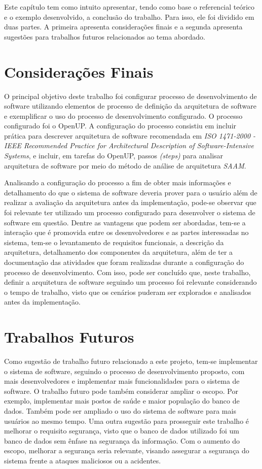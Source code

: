 Este capítulo tem como intuito apresentar, tendo como base o referencial teórico e o exemplo desenvolvido, a conclusão do trabalho. Para isso, ele foi dividido em duas partes. A primeira apresenta considerações finais e a segunda apresenta sugestões para trabalhos futuros relacionados ao tema abordado.

\section{Considerações Finais}

O principal objetivo deste trabalho foi configurar processo de desenvolvimento de software utilizando elementos de processo de definição da arquitetura de software e exemplificar o uso do processo de desenvolvimento configurado. O processo configurado foi o OpenUP.  A configuração do processo consistiu em incluir prática para descrever arquitetura de software recomendada em \emph{ISO 1471-2000 - IEEE Recommended Practice for Architectural Description of Software-Intensive Systems}, e incluir, em tarefas do OpenUP, passos \emph{(steps)} para analisar arquitetura de software por meio do método de análise de arquitetura \emph{\acrfull{SAAM}}.

Analisando a configuração do processo a fim de obter mais informações e detalhamento do que o sistema de software deveria prover para o usuário além de realizar a avaliação da arquitetura antes da implementação, pode-se observar que foi relevante ter utilizado um processo configurado para desenvolver o sistema de software em questão. Dentre as vantagens que podem ser abordadas, tem-se a interação que é promovida entre os desenvolvedores e as partes interessadas no sistema, tem-se o levantamento de requisitos funcionais, a descrição da arquitetura, detalhamento dos componentes da arquitetura, além de ter a documentação das atividades que foram realizadas durante a configuração do processo de desenvolvimento. Com isso, pode ser concluído que, neste trabalho, definir a arquitetura de software seguindo um processo foi relevante considerando o tempo de trabalho, visto que os cenários puderam ser explorados e analisados antes da implementação.

\section{Trabalhos Futuros}

Como sugestão de trabalho futuro relacionado a este projeto, tem-se  implementar o sistema de software, seguindo o processo de desenvolvimento proposto, com mais desenvolvedores e implementar mais funcionalidades para o sistema de software. O trabalho futuro pode também considerar ampliar o escopo. Por exemplo, implementar mais postos de saúde e maior população do banco de dados. Também pode ser ampliado o uso do sistema de software para mais usuários ao mesmo tempo. Uma outra sugestão para prosseguir este trabalho é melhorar o requisito segurança, visto que o banco de dados utilizado foi um banco de dados sem ênfase na segurança da informação. Com o aumento do escopo, melhorar a segurança seria relevante, visando assegurar a segurança do sistema frente a ataques maliciosos ou a acidentes. 


